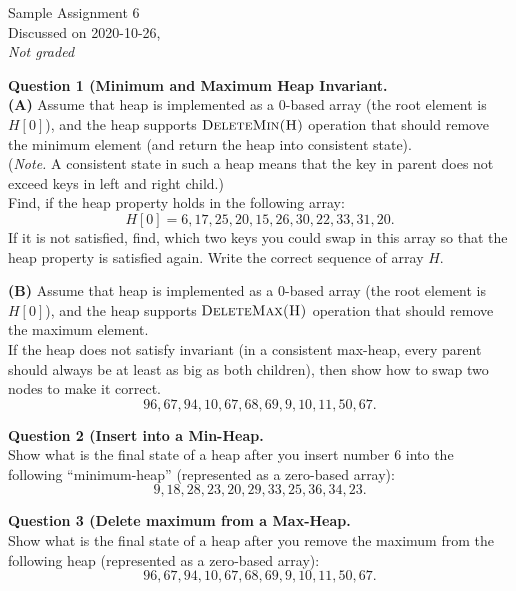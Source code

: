 \documentclass[a4paper,12pt]{article}
\begin{document}
\twocolumn

\thispagestyle{empty}

\begin{center}
{\Large Sample Assignment 6}\\
{\Large Discussed on 2020-10-26,}\\
{\em Not graded} 
\end{center}

\noindent


\vspace{10pt}
{\bf Question 1 (Minimum and Maximum Heap Invariant.}\\
{\bf (A)} Assume that heap is implemented as a
$0$-based array (the root element is $H[0]$), and the
heap supports $\text{\sc DeleteMin(H)}$ operation that 
should remove the minimum element (and return the heap into 
consistent state).\\
({\em Note.} A consistent state in such a heap means that 
the key in parent does not exceed keys in left and right child.)\\
Find, if the heap property holds in the following array:
$$H[0]=6, 17, 25, 20, 15, 26, 30, 22, 33, 31, 20.$$
If it is not satisfied, find, which two keys
you could swap in this array so that the heap property is satisfied again.
Write the correct sequence of array $H$. 


\vspace{10pt}
{\bf (B)} Assume that heap is implemented as a
$0$-based array (the root element is $H[0]$), and the
heap supports $\text{\sc DeleteMax(H)}$ operation that 
should remove the maximum element.\\
If the heap does not satisfy invariant (in a consistent
max-heap, every parent 
should always be at least as big as both children), then show how to 
swap two nodes to make it correct.\\
$$96, 67, 94, 10, 67, 68, 69,  9, 10, 11, 50, 67.$$


\vspace{20pt}
{\bf Question 2 (Insert into a Min-Heap.}\\
Show what is the final state of a heap after you insert number $6$ into 
the following ``minimum-heap'' (represented as a zero-based array): 
$$9, 18, 28, 23, 20, 29, 33, 25, 36, 34, 23.$$


\vspace{20pt}
{\bf Question 3 (Delete maximum from a Max-Heap.}\\
Show what is the final state of a heap after you remove the maximum from
the following heap (represented as a zero-based array): 
$$96, 67, 94, 10, 67, 68, 69,  9, 10, 11, 50, 67.$$
\end{document}
